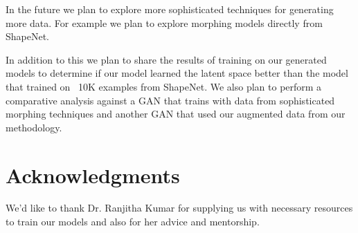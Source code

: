 \documentclass{sigchi}
\begin{document}
In the future we plan to explore more sophisticated techniques for generating more data. For example we plan to explore morphing models directly from ShapeNet. 

In addition to this we plan to share the results of training on our generated models to determine if our model learned the latent space better than the model that trained on ~10K examples from ShapeNet. We also plan to perform a comparative analysis against a GAN that trains with data from sophisticated morphing techniques and another GAN that used our augmented data from our methodology.


\section{Acknowledgments}
We'd like to thank Dr. Ranjitha Kumar for supplying us with necessary resources to train our models and also for her advice and mentorship.
\balance




\end{document}
